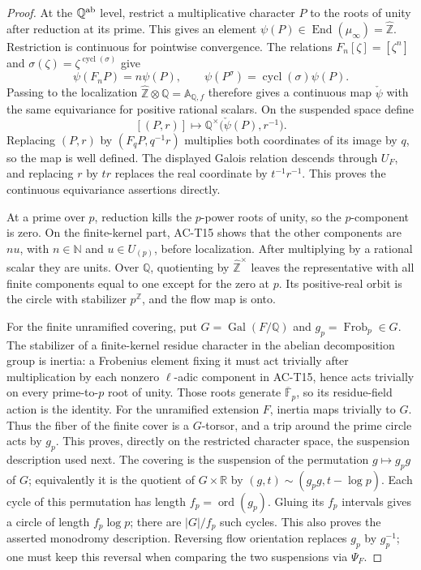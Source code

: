 \begin{proof}
At the \(\mathbb Q^{\rm ab}\) level, restrict a multiplicative
character \(P\) to the roots of unity after reduction at its prime.
This gives an element \(\psi(P)\in
\operatorname{End}(\mu_\infty)=\widehat{\mathbb Z}\).
Restriction is continuous for pointwise convergence.
The relations \(F_n[\zeta]=[\zeta^n]\) and
\(\sigma(\zeta)=\zeta^{\operatorname{cycl}(\sigma)}\) give
\[
 \psi(F_nP)=n\psi(P),\qquad
 \psi(P^\sigma)=\operatorname{cycl}(\sigma)\psi(P).
\]
Passing to the localization
\(\widehat{\mathbb Z}\otimes\mathbb Q=\mathbb A_{\mathbb Q,f}\)
therefore gives a continuous map \(\check\psi\) with the
same equivariance for positive rational scalars.  On the suspended
space define
\[
 [(P,r)]\longmapsto
 \mathbb Q^\times\bigl(\check\psi(P),r^{-1}\bigr).
\]
Replacing \((P,r)\) by \((F_qP,q^{-1}r)\) multiplies both coordinates
of its image by \(q\), so the map is well defined.  The displayed
Galois relation descends through \(U_F\), and replacing \(r\) by
\(tr\) replaces the real coordinate by \(t^{-1}r^{-1}\).
This proves the continuous equivariance assertions directly.

At a prime over \(p\), reduction kills the \(p\)-power roots of
unity, so the \(p\)-component is zero.  On the finite-kernel
part, AC-T15 shows that the other components are \(nu\), with
\(n\in\mathbb N\) and \(u\in U_{(p)}\), before localization.
After multiplying by a rational scalar they are units.  Over
\(\mathbb Q\), quotienting by \(\widehat{\mathbb Z}^{\times}\)
leaves the representative with all finite components equal to
one except for the zero at \(p\).  Its positive-real orbit is
the circle with stabilizer \(p^{\mathbb Z}\), and the flow map
is onto.

For the finite unramified covering, put
\(G=\operatorname{Gal}(F/\mathbb Q)\) and
\(g_p=\operatorname{Frob}_p\in G\).
The stabilizer of a finite-kernel residue character in the
abelian decomposition group is inertia: a Frobenius element
fixing it must act trivially after multiplication by each
nonzero \(\ell\)-adic component in AC-T15, hence acts trivially
on every prime-to-\(p\) root of unity.  Those roots generate
\(\overline{\mathbb F}_p\), so its residue-field action is the
identity.  For the unramified extension \(F\), inertia maps
trivially to \(G\).  Thus the fiber of the finite cover is a
\(G\)-torsor, and a trip around the prime circle acts by
\(g_p\).  This proves, directly on the restricted character
space, the suspension description used next.
The covering is the suspension of the permutation
\(g\mapsto g_pg\) of \(G\); equivalently it is the quotient of
\(G\times\mathbb R\) by
\((g,t)\sim(g_pg,t-\log p)\).
Each cycle of this permutation has length
\(f_p=\operatorname{ord}(g_p)\).  Gluing its \(f_p\) intervals
gives a circle of length \(f_p\log p\); there are
\(|G|/f_p\) such cycles.  This also proves the asserted
monodromy description.  Reversing flow orientation replaces
\(g_p\) by \(g_p^{-1}\); one must keep this reversal when
comparing the two suspensions via \(\Psi_F\).
\end{proof}

